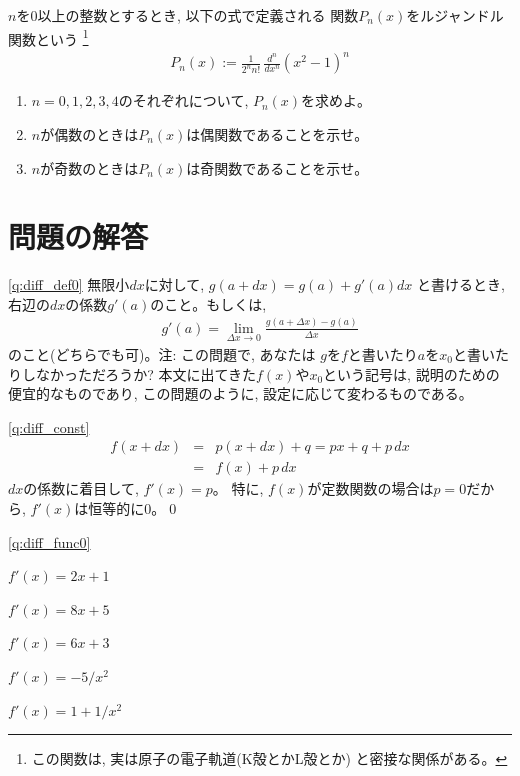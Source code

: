 \begin{exq}\label{q:diff_Legendre} $n$を0以上の整数とするとき, 以下の式で定義される
関数$P_n(x)$をルジャンドル関数という
\footnote{この関数は, 実は原子の電子軌道(K殻とかL殻とか)
と密接な関係がある。}
\begin{eqnarray}
P_n(x) :=\frac{1}{2^n n!}\,\frac{d^n}{dx^n}(x^2-1)^n
\end{eqnarray}
\begin{enumerate}
\item $n=0, 1, 2, 3, 4$のそれぞれについて, $P_n(x)$を求めよ。
\item $n$が偶数のときは$P_n(x)$は偶関数であることを示せ。
\item $n$が奇数のときは$P_n(x)$は奇関数であることを示せ。
\end{enumerate}
\end{exq}
\vv

\section*{問題の解答}


%
\ref{q:diff_def0}  無限小$dx$に対して, 
$g(a+dx) = g(a)+g'(a)dx$
と書けるとき, 右辺の$dx$の係数$g'(a)$のこと。もしくは, 
\begin{eqnarray*}g'(a)=\lim_{\Delta x \to 0} \frac{g(a+\Delta x)-g(a)}{\Delta x}\end{eqnarray*}
のこと(どちらでも可)。{\small 注: この問題で, あなたは
$g$を$f$と書いたり$a$を$x_0$と書いたりしなかっただろうか? 
本文に出てきた$f(x)$や$x_0$という記号は, 説明のための
便宜的なものであり, この問題のように, 設定に応じて変わるものである。}
\mv

%
\ref{q:diff_const} 
\begin{eqnarray*}
f(x+dx)&=&p(x+dx) + q=px+q+p\,dx\\
       &=&f(x)+p\,dx
\end{eqnarray*}
$dx$の係数に着目して, $f'(x)=p$。
特に, $f(x)$が定数関数の場合は$p=0$だから, 
$f'(x)$は恒等的に0。\qed
\mv


\ref{q:diff_func0}
\begin{edaenumerate}
\item $f'(x)=2x+1$
\item $f'(x)=8x+5$
\item $f'(x)=6x+3$
\item $f'(x)=-5/x^2$
\item $f'(x)=1+1/x^2$
\end{edaenumerate}

